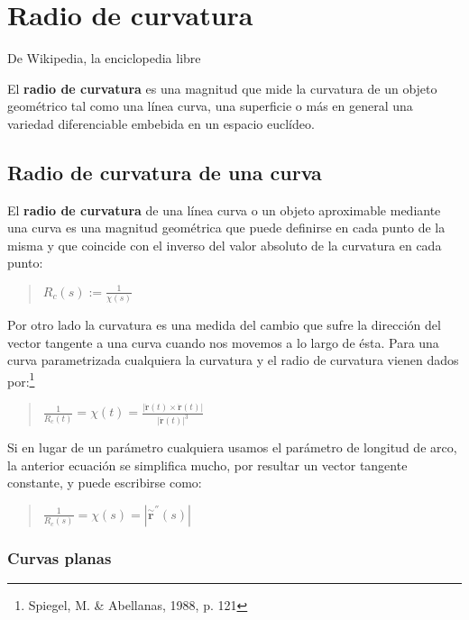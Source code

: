 \documentclass[11pt]{article}
\author{javier}
\date{\today}
\title{}
\begin{document}
\section{Radio de curvatura}
\label{sec:org64b49bf}

De Wikipedia, la enciclopedia libre

El \textbf{radio de curvatura} es una magnitud que mide la
curvatura de un objeto geométrico tal como una
línea curva, una superficie o más en general una
variedad diferenciable embebida en un
espacio euclídeo.

\subsection{Radio de curvatura de una curva}
\label{sec:orgb0eed8d}

El \textbf{radio de curvatura} de una línea curva o un objeto
aproximable mediante una curva es una magnitud geométrica que puede
definirse en cada punto de la misma y que coincide con el inverso del
valor absoluto de la curvatura en cada punto:

\begin{quote}
\(R_{c}(s):=\frac{1}{\chi(s)}\)
\end{quote}

Por otro lado la curvatura es una medida del cambio que sufre la
dirección del vector tangente a una curva cuando nos movemos a lo largo
de ésta. Para una curva parametrizada cualquiera la curvatura y el radio
de curvatura vienen dados por:\footnote{Spiegel, M. \& Abellanas, 1988, p. 121} 

\begin{quote}
\(\frac{1}{R_{c}(t)} = \chi(t) = \frac{\left| \dot{\mathbf{r}}(t) \times \ddot{\mathbf{r}}(t) \right|}{\left| \dot{\mathbf{r}}(t) \right|^{3}}\)
\end{quote}

Si en lugar de un parámetro cualquiera usamos el parámetro de
longitud de arco, la anterior ecuación se
simplifica mucho, por resultar un vector tangente constante, y puede
escribirse como:

\begin{quote}
\(\frac{1}{R_{c}(s)} = \chi(s) = \left| {{\overset{\sim}{\mathbf{r}}}^{''}(s)} \right|\)
\end{quote}

\subsubsection{Curvas planas}
\label{sec:org567b15d}
\end{document}
